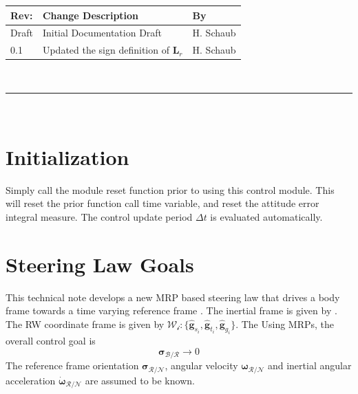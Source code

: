 \documentclass[]{BasiliskReportMemo}
\begin{document}
\makeCover


%
%
\pagestyle{empty}
{\renewcommand{\arraystretch}{2}
\noindent
\begin{longtable}{|p{0.5in}|p{4.5in}|p{1.14in}|}
\hline
{\bfseries Rev}: & {\bfseries Change Description} & {\bfseries By} \\
\hline
Draft & Initial Documentation Draft & H. Schaub \\
0.1 & Updated the sign definition of $\bm L_{r}$ & H. Schaub \\
\hline

\end{longtable}
}

\newpage
\setcounter{page}{1}
\pagestyle{fancy}

\tableofcontents
~\\ \hrule ~\\



\section{Initialization}
Simply call the module reset function prior to using this control module.  This will reset the prior function call time variable, and reset the attitude error integral measure.  The control update period $\Delta t$ is evaluated automatically.  


\section{Steering Law Goals}
This technical note develops a new MRP based steering law that drives a body frame  towards a time varying reference frame . The inertial frame is given by .   The RW coordinate frame is given by $\mathcal{W_{i}}:\{ \hat{\bm g}_{s_{i}}, \hat{\bm g}_{t_{i}}, \hat{\bm g}_{g_{i}} \}$.  The   Using MRPs, the overall control goal is 
\begin{equation}
	\label{eq:MS:1}
	\bm\sigma_{\mathcal{B}/\mathcal{R}} \rightarrow 0
\end{equation}
The reference frame orientation $\bm \sigma_{\mathcal{R}/\mathcal{N}}$, angular velocity $\bm\omega_{\mathcal{R}/\mathcal{N}}$ and inertial angular acceleration $\dot{\bm \omega}_{\mathcal{R}/\mathcal{N}}$ are assumed to be known. 
\end{document}

